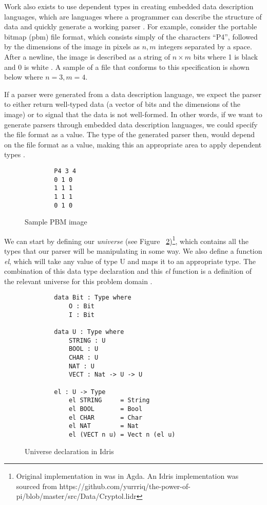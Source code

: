 Work also exists to use dependent types in creating embedded data description
languages, which are languages where a programmer can describe the structure of
data and quickly generate a working parser \cite{power_of_pi}.  For example,
consider the portable bitmap (pbm) file format, which consists simply of the
characters ``P4'', followed by the dimensions of the image in pixels as $n, m$
integers separated by a space. After a newline, the image is described as a
string of $n\times m $ bits where 1 is black and 0 is white \cite{pmb_spec}. A
sample of a file that conforms to this specification is shown below where $n=3,
m=4$. 

If a parser were generated from a data description language, we expect the
parser to either return well-typed data (a vector of bits and the dimensions of
the image) or to signal that the data is not well-formed. In other words, if we
want to generate parsers through embedded data description languages, we could
specify the file format as a value. The type of the generated parser then, would
depend on the file format as a value, making this an appropriate area to apply
dependent types \cite{power_of_pi}. 

\begin{figure}[h]
    \centering
    \caption{Sample PBM image}
    \label{pbm_sample}
    \begin{lstlisting}
        P4 3 4
        0 1 0
        1 1 1
        1 1 1
        0 1 0
    \end{lstlisting}
\end{figure}

We can start by defining our \textit{universe} (see Figure
~\ref{universe})\footnote{\label{idris_source}Original implementation in
\cite{power_of_pi} was in Agda. An Idris implementation was sourced from
https://github.com/yurrriq/the-power-of-pi/blob/master/src/Data/Cryptol.lidr },
which contains all the types that our parser will be manipulating in some way.
We also define a function \textit{el}, which will take any value of type U and
maps it to an appropriate type. The combination of this data type declaration
and this \textit{el} function is a definition of the relevant universe for this
problem domain \cite{power_of_pi}. 

\begin{figure}[h]
    \caption{Universe declaration in Idris \protect\cite{power_of_pi}}
    \label{universe}
    \begin{lstlisting}
        data Bit : Type where 
            O : Bit 
            I : Bit

        data U : Type where
            STRING : U
            BOOL : U
            CHAR : U
            NAT : U
            VECT : Nat -> U -> U
        
        el : U -> Type
            el STRING     = String
            el BOOL       = Bool
            el CHAR       = Char
            el NAT        = Nat
            el (VECT n u) = Vect n (el u)
    \end{lstlisting}
\end{figure}

